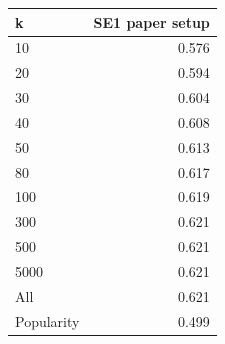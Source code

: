 \begin{tabular}{lr}
\toprule
k & SE1 \textperiodcentered{} paper setup \\
\midrule
10 & 0.576 \\
20 & 0.594 \\
30 & 0.604 \\
40 & 0.608 \\
50 & 0.613 \\
80 & 0.617 \\
100 & 0.619 \\
300 & 0.621 \\
500 & 0.621 \\
5000 & 0.621 \\
\midrule
All & 0.621 \\
Popularity & 0.499 \\
\bottomrule
\end{tabular}
